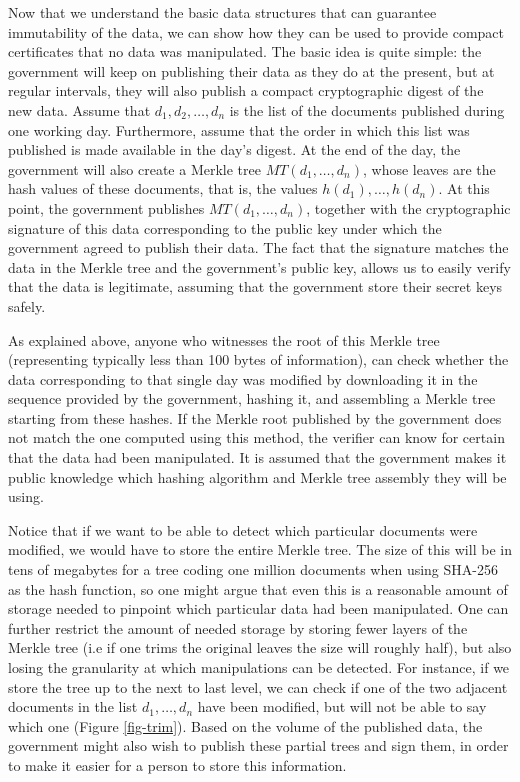 \medskip
{} Now that we understand the basic data structures that can guarantee immutability of the data, we can show how they can be used to provide compact certificates that no data was manipulated. The basic idea is quite simple: the government will keep on publishing their data as they do at the present, but at regular intervals, they will also publish a compact cryptographic digest of the new data. Assume that $d_1,d_2,\ldots ,d_n$ is the list of the documents published during one working day. Furthermore, assume that the order in which this list was published is made available in the day's digest. At the end of the day, the government will also create a Merkle tree $MT(d_1,\ldots ,d_n)$, whose leaves are the hash values of these documents, that is, the values $h(d_1),\ldots ,h(d_n)$. At this point, the government publishes $MT(d_1,\ldots ,d_n)$, together with the cryptographic signature of this data corresponding to the public key under which the government agreed to publish their data. The fact that the signature matches the data in the Merkle tree and the government's public key, allows us to easily verify that the data is legitimate, assuming that the government store their secret keys safely.

As explained above, anyone who witnesses the root of this Merkle tree (representing typically less than 100 bytes of information), can check whether the data corresponding to that single day was modified by downloading it in the sequence provided by the government, hashing it, and assembling a Merkle tree starting from these hashes. If the Merkle root published by the government does not match the one computed using this method, the verifier can know for certain that the data had been manipulated. It is assumed that the government makes it public knowledge which hashing algorithm and Merkle tree assembly they will be using.

Notice that if we want to be able to detect which particular documents were modified, we would have to store the entire Merkle tree. The size of this will be in tens of megabytes for a tree coding one million documents when using SHA-256 as the hash function, so one might argue that even this is a reasonable amount of storage needed to pinpoint which particular data had been manipulated. One can further restrict the amount of needed storage by storing fewer layers of the Merkle tree (i.e if one trims the original leaves the size will roughly half), but also losing the granularity at which manipulations can be detected. For instance, if we store the tree up to the next to last level, we can check if one of the two adjacent documents in the list $d_1,\ldots ,d_n$ have been modified, but will not be able to say which one (Figure \ref{fig-trim}). Based on the volume of the published data, the government might also wish to publish these partial trees and sign them, in order to make it easier for a person to store this information.

